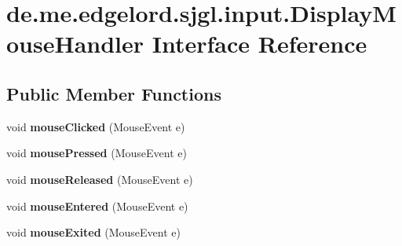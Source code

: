 \hypertarget{interfacede_1_1me_1_1edgelord_1_1sjgl_1_1input_1_1_display_mouse_handler}{}\section{de.\+me.\+edgelord.\+sjgl.\+input.\+Display\+Mouse\+Handler Interface Reference}
\label{interfacede_1_1me_1_1edgelord_1_1sjgl_1_1input_1_1_display_mouse_handler}
\subsection*{Public Member Functions}
\begin{DoxyCompactItemize}
\item 
\mbox{\label{interfacede_1_1me_1_1edgelord_1_1sjgl_1_1input_1_1_display_mouse_handler_a0fa5dca8f3886ce21246e56cc2636f4d}} 
void {\bfseries mouse\+Clicked} (Mouse\+Event e)
\item 
\mbox{\label{interfacede_1_1me_1_1edgelord_1_1sjgl_1_1input_1_1_display_mouse_handler_a1a846dd3475dc4d412b51ce91bc94750}} 
void {\bfseries mouse\+Pressed} (Mouse\+Event e)
\item 
\mbox{\label{interfacede_1_1me_1_1edgelord_1_1sjgl_1_1input_1_1_display_mouse_handler_acf1b32a1bc6aea95e8dcab413665bc55}} 
void {\bfseries mouse\+Released} (Mouse\+Event e)
\item 
\mbox{\label{interfacede_1_1me_1_1edgelord_1_1sjgl_1_1input_1_1_display_mouse_handler_ab5d4cc18dd8099cbfc6ad8ed72a06e8d}} 
void {\bfseries mouse\+Entered} (Mouse\+Event e)
\item 
\mbox{\label{interfacede_1_1me_1_1edgelord_1_1sjgl_1_1input_1_1_display_mouse_handler_adfbb427a686ea8db3755c1dda04fb999}} 
void {\bfseries mouse\+Exited} (Mouse\+Event e)
\item 
\mbox{\label{interfacede_1_1me_1_1edgelord_1_1sjgl_1_1input_1_1_display_mouse_handler_af608fb2c9076c53bc4bda91d3e27f6bd}} 

\end{DoxyCompactItemize}
